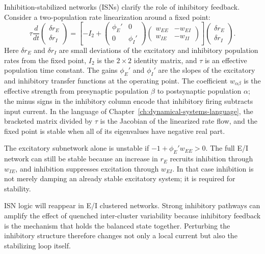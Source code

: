 Inhibition-stabilized networks (ISNs) clarify the role of inhibitory feedback.
Consider a two-population rate linearization around a fixed point:
%
\begin{equation}
  \tau \frac{d}{dt}
  \begin{pmatrix}
    \delta r_E\\
    \delta r_I
  \end{pmatrix}
  =
  \left[
  -I_2+
  \begin{pmatrix}
    \phi_E' & 0\\
    0 & \phi_I'
  \end{pmatrix}
  \begin{pmatrix}
    w_{EE} & -w_{EI}\\
    w_{IE} & -w_{II}
  \end{pmatrix}
  \right]
  \begin{pmatrix}
    \delta r_E\\
    \delta r_I
  \end{pmatrix}.
  \label{eq:ch04-isn-linearization}
\end{equation}
%
Here $\delta r_E$ and $\delta r_I$ are small deviations of the excitatory and
inhibitory population rates from the fixed point, $I_2$ is the $2\times2$
identity matrix, and $\tau$ is an effective population time constant. The gains
$\phi_E'$ and $\phi_I'$ are the slopes of the excitatory and inhibitory transfer
functions at the operating point. The coefficient $w_{\alpha\beta}$ is the
effective strength from presynaptic population $\beta$ to postsynaptic
population $\alpha$; the minus signs in the inhibitory column encode that
inhibitory firing subtracts input current. In the language of
Chapter~\ref{ch:dynamical-systems-language}, the bracketed matrix divided by
$\tau$ is the Jacobian of the linearized rate flow, and the fixed point is stable
when all of its eigenvalues have negative real part.

The excitatory subnetwork alone is unstable if $-1+\phi_E'w_{EE}>0$. The full
E/I network can still be stable because an increase in $r_E$ recruits inhibition
through $w_{IE}$, and inhibition suppresses excitation through $w_{EI}$. In
that case inhibition is not merely damping an already stable excitatory system;
it is required for stability.

ISN logic will reappear in E/I clustered networks. Strong inhibitory pathways
can amplify the effect of quenched inter-cluster variability because inhibitory
feedback is the mechanism that holds the balanced state together. Perturbing
the inhibitory structure therefore changes not only a local current but also the
stabilizing loop itself.

